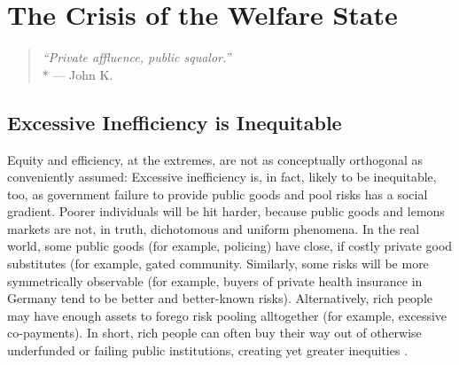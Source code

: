 



\section{The Crisis of the Welfare State}

\begin{quote}
	\emph{``Private affluence, public squalor.''}
	\\*
	--- John K.~\citet{Galbraith1959}
\end{quote}




\subsection{Excessive Inefficiency is Inequitable} \label{sec:InefficiencyIsInequitable}
Equity and efficiency, at the extremes, are not as conceptually orthogonal as conveniently assumed:
Excessive inefficiency is, in fact, likely to be inequitable, too, as government failure to provide public goods and pool risks has a social gradient.
Poorer individuals will be hit harder, because public goods and lemons markets are not, in truth, dichotomous and uniform phenomena.
In the real world, some public goods (for example, policing) have close, if costly private good substitutes (for example, gated community.
Similarly, some risks will be more symmetrically observable (for example, buyers of private health insurance in Germany tend to be better and better-known risks).
Alternatively, rich people may have enough assets to forego risk pooling alltogether (for example, excessive co-payments).
In short, rich people can often buy their way out of otherwise underfunded or failing public institutions, creating yet greater inequities \citep{Barry2002}.


